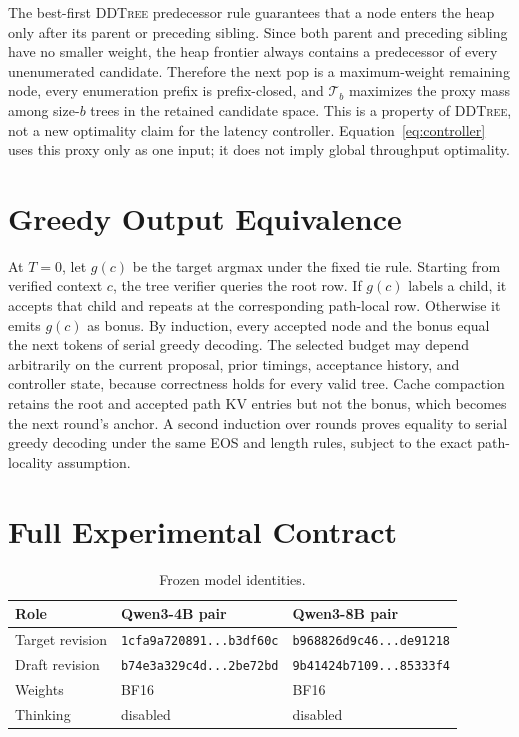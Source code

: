 \documentclass{article}
\newcommand{\T}{\mathcal{T}}
\newcommand{\DDTree}{\textnormal{\textsc{DDTree}}}
\begin{document}
The best-first \DDTree{} predecessor rule guarantees that a node enters the heap only after its parent or preceding sibling.  Since both parent and preceding sibling have no smaller weight, the heap frontier always contains a predecessor of every unenumerated candidate.  Therefore the next pop is a maximum-weight remaining node, every enumeration prefix is prefix-closed, and $\T_b$ maximizes the proxy mass among size-$b$ trees in the retained candidate space.  This is a property of \DDTree, not a new optimality claim for the latency controller.  Equation~\eqref{eq:controller} uses this proxy only as one input; it does not imply global throughput optimality.

\section{Greedy Output Equivalence}
\label{app:greedy}

At $T=0$, let $g(c)$ be the target argmax under the fixed tie rule.  Starting from verified context $c$, the tree verifier queries the root row.  If $g(c)$ labels a child, it accepts that child and repeats at the corresponding path-local row.  Otherwise it emits $g(c)$ as bonus.  By induction, every accepted node and the bonus equal the next tokens of serial greedy decoding.  The selected budget may depend arbitrarily on the current proposal, prior timings, acceptance history, and controller state, because correctness holds for every valid tree.  Cache compaction retains the root and accepted path KV entries but not the bonus, which becomes the next round's anchor.  A second induction over rounds proves equality to serial greedy decoding under the same EOS and length rules, subject to the exact path-locality assumption.

\section{Full Experimental Contract}
\label{app:protocol}

\begin{table}[h]
\centering
\caption{Frozen model identities.}
\small
\begin{tabular}{lll}
\toprule
Role & Qwen3-4B pair & Qwen3-8B pair \\
\midrule
Target revision & \texttt{1cfa9a720891...b3df60c} & \texttt{b968826d9c46...de91218} \\
Draft revision & \texttt{b74e3a329c4d...2be72bd} & \texttt{9b41424b7109...85333f4} \\
Weights & BF16 & BF16 \\
Thinking & disabled & disabled \\
\bottomrule
\end{tabular}
\end{table}
\end{document}
